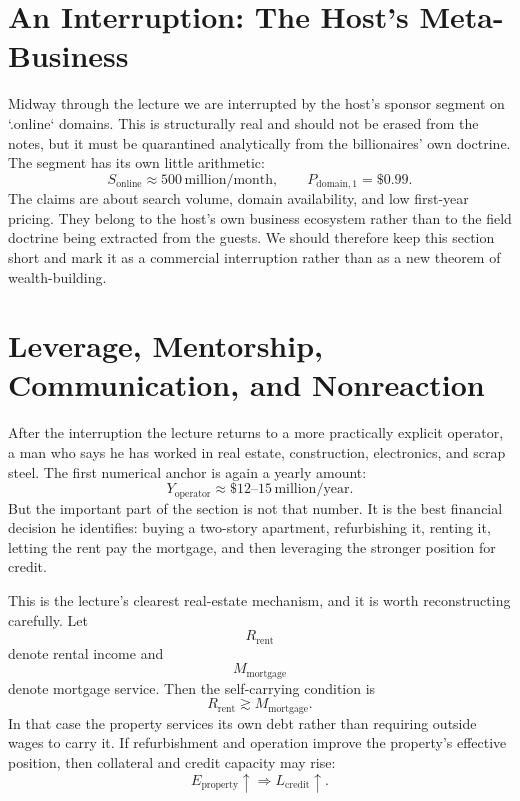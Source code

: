 \section{An Interruption: The Host's Meta-Business}

Midway through the lecture we are interrupted by the host's sponsor segment on `.online` domains. This is structurally real and should not be erased from the notes, but it must be quarantined analytically from the billionaires' own doctrine. The segment has its own little arithmetic:
\begin{equation}
S_{\text{online}} \approx 500\,\text{million/month},
\qquad
P_{\text{domain},1} = \$0.99.
\end{equation}
The claims are about search volume, domain availability, and low first-year pricing. They belong to the host's own business ecosystem rather than to the field doctrine being extracted from the guests. We should therefore keep this section short and mark it as a commercial interruption rather than as a new theorem of wealth-building.

\section{Leverage, Mentorship, Communication, and Nonreaction}

After the interruption the lecture returns to a more practically explicit operator, a man who says he has worked in real estate, construction, electronics, and scrap steel. The first numerical anchor is again a yearly amount:
\begin{equation}
Y_{\text{operator}} \approx \$12\text{--}15\,\text{million/year}.
\end{equation}
But the important part of the section is not that number. It is the best financial decision he identifies: buying a two-story apartment, refurbishing it, renting it, letting the rent pay the mortgage, and then leveraging the stronger position for credit.

This is the lecture's clearest real-estate mechanism, and it is worth reconstructing carefully. Let
\[
R_{\text{rent}}
\]
denote rental income and
\[
M_{\text{mortgage}}
\]
denote mortgage service. Then the self-carrying condition is
\begin{equation}
R_{\text{rent}} \gtrsim M_{\text{mortgage}}.
\end{equation}
In that case the property services its own debt rather than requiring outside wages to carry it. If refurbishment and operation improve the property's effective position, then collateral and credit capacity may rise:
\begin{equation}
E_{\text{property}} \uparrow \Rightarrow L_{\text{credit}} \uparrow.
\end{equation}

